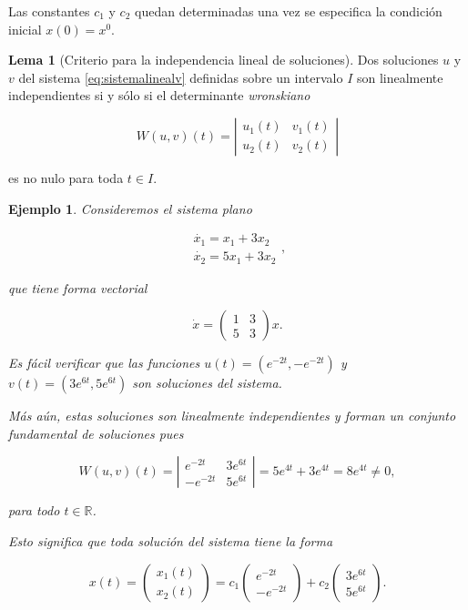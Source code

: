 \documentclass[11pt]{book}
\theoremstyle{definition}
\numberwithin{definition}{section}
\theoremstyle{theorem}
\newtheorem{lemma}{Lema}
\numberwithin{theorem}{section}
\numberwithin{lemma}{section}
\numberwithin{corollary}{section}
\theoremstyle{plain}
\newtheorem{example}{Ejemplo}
\numberwithin{example}{section}
\newcommand{\R}{{\ensuremath{\mathbb{R}}}}
\begin{document}
Las constantes $c_1$ y $c_2$ quedan determinadas una vez se especifica la condición inicial $x(0) = x^0$.

\begin{lemma}[Criterio para la independencia lineal de soluciones]
Dos soluciones $u$ y $v$ del sistema \ref{eq:sistemalinealv} definidas sobre un intervalo $I$ son linealmente independientes si y sólo si el determinante \emph{wronskiano}

$$ W(u,v)(t) = \left|
	\begin{array}{ll}
		u_1(t) & v_1(t) \\
		u_2(t) & v_2(t)
	\end{array}
\right|$$

es no nulo para toda $t \in I$.
\end{lemma}

\begin{example}
Consideremos el sistema plano

$$
	\begin{array}{l}
		\dot{x_1} = x_1 + 3x_2 \\
		\dot{x_2} = 5x_1 + 3x_2
	\end{array},
$$

que tiene forma vectorial

$$ \dot{x} = \left(
	\begin{array}{ll}
		1 & 3 \\ 5 & 3
	\end{array}
\right) x.$$

Es fácil verificar que las funciones $u(t) = (e^{-2t}, -e^{-2t})$ y $v(t) = (3e^{6t}, 5e^{6t})$ son soluciones del sistema.

Más aún, estas soluciones son linealmente independientes y forman un conjunto fundamental de soluciones pues

$$
	W(u,v)(t) =
\left|
	\begin{array}{ll}
		e^{-2t} & 3e^{6t} \\
		-e^{-2t} & 5e^{6t}
	\end{array}
\right| = 5e^{4t} + 3e^{4t} = 8e^{4t} \neq 0,
$$

para todo $t \in \R$.

Esto significa que toda solución del sistema tiene la forma

$$ x(t) = \left( \begin{array}{l} x_1(t) \\ x_2(t) \end{array} \right)
= c_1 \left( \begin{array}{l} e^{-2t} \\ -e^{-2t} \end{array} \right) + c_2 \left( \begin{array}{l} 3e^{6t} \\ 5e^{6t} \end{array} \right).$$
\end{example}
\end{document}
